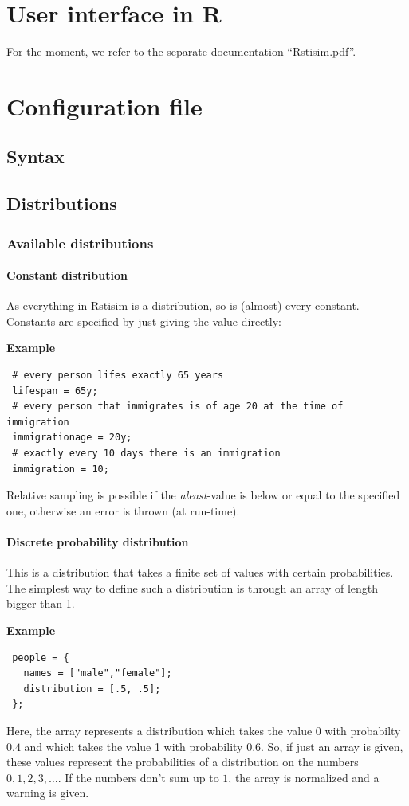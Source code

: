 \documentclass[11pt]{article}
\newenvironment{example}{\par\smallskip\noindent\begingroup\small\textbf{\small Example\enskip}}{\endgroup\par\smallskip}
\begin{document}
\section{User interface in R}
\label{ch:Rdocu}
For the moment, we refer to the separate documentation ``Rstisim.pdf''.

\section{Configuration file}
\label{ch:configuration}

\subsection{Syntax}

\subsection{Distributions}

\subsubsection{Available distributions}

\paragraph{Constant distribution}
As everything in Rstisim is a distribution, so is (almost) every constant. Constants are specified by just giving the value directly: 
\begin{example}
\begin{verbatim}
 # every person lifes exactly 65 years
 lifespan = 65y;
 # every person that immigrates is of age 20 at the time of immigration
 immigrationage = 20y;
 # exactly every 10 days there is an immigration
 immigration = 10;
\end{verbatim}
\end{example}
Relative sampling is possible if the \emph{aleast}-value is below or equal to the specified one, otherwise an error is thrown (at run-time).

\paragraph{Discrete probability distribution}
This is a distribution that takes a finite set of values with certain probabilities. The simplest way to define such a distribution is through an array of length bigger than 1.
\begin{example}
\begin{verbatim}
 people = {
   names = ["male","female"];
   distribution = [.5, .5];
 }; 
\end{verbatim}
\end{example}
Here, the array \text{[.4, .6]} represents a distribution which takes the value 0 with probabilty $0.4$ and which takes the value 1 with probability $0.6$. So, if just an array is given, these values represent the probabilities of a
distribution on the numbers $0, 1, 2, 3, \dots$. If the numbers don't sum up to $1$, the array is normalized and a warning is given.
\end{document}
